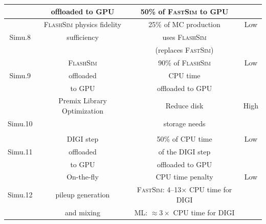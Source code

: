 \begin{table}[tbph]
\begin{tabular}{|c|c|c|c|}
    \cellcolor{tablerowheader}
            &  offloaded to GPU    & 50\% of \textsc{FastSim} to GPU                               &            \\ \hline
    \cellcolor{tablerowheader}
            &  \textsc{FlashSim} physics fidelity   & 25\% of MC production                                &  Low       \\
    \cellcolor{tablerowheader}
    Simu.8  &  sufficiency                 & uses \textsc{FlashSim}                                              &            \\
    \cellcolor{tablerowheader}
            &                              &   (replaces \textsc{FastSim})                                       &            \\ \hline
    \cellcolor{tablerowheader}
            &    \textsc{FlashSim}                  & 90\% of \textsc{FlashSim}                                           &  Low       \\
    \cellcolor{tablerowheader}
    Simu.9 &    offloaded                 & \gls{CPU} time                                             &            \\
    \cellcolor{tablerowheader}
            &         to GPU       &    offloaded to GPU                                &            \\ \hline
    \cellcolor{tablerowheader}
            &  Premix Library Optimization & Reduce disk                                                &   High     \\
    \cellcolor{tablerowheader}
    Simu.10  &                              & storage needs                                              &            \\
    \cellcolor{tablerowheader}
            &                              &                                                        &            \\ \hline
    \cellcolor{tablerowheader}
            &  DIGI step             & 50\% of CPU time &   Low      \\
    \cellcolor{tablerowheader}
    Simu.11 &  offloaded                   & of the DIGI step                                     &            \\
    \cellcolor{tablerowheader}
            &     to GPU           & offloaded to GPU                                   &            \\ \hline
    \cellcolor{tablerowheader}
            &    On-the-fly                & CPU time penalty                                     &  Low       \\
    \cellcolor{tablerowheader}
    Simu.12 &    pileup generation         & \textsc{FastSim}: 4--13$\times$ CPU time for DIGI       &            \\
    \cellcolor{tablerowheader}
            &         and mixing           & ML: ${\approx}3{\times}$ CPU time for DIGI  &            \\ \hline
    \end{tabular}
    \label{tab:sim-improvements}
\end{table}

